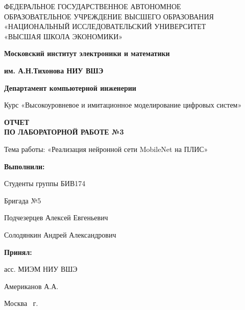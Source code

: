 \begin{titlepage}
    \begin{center}
        ФЕДЕРАЛЬНОЕ ГОСУДАРСТВЕННОЕ АВТОНОМНОЕ \\
        ОБРАЗОВАТЕЛЬНОЕ УЧРЕЖДЕНИЕ ВЫСШЕГО ОБРАЗОВАНИЯ\\
        «НАЦИОНАЛЬНЫЙ ИССЛЕДОВАТЕЛЬСКИЙ УНИВЕРСИТЕТ\\
        «ВЫСШАЯ ШКОЛА ЭКОНОМИКИ»
    \end{center}

    \begin{center}
        \textbf{Московский институт электроники и математики}

        \textbf{им. А.Н.Тихонова НИУ ВШЭ}

        \vspace{2ex}

        \textbf{Департамент компьютерной инженерии}
    \end{center}
    \vspace{1ex}

    \begin{center}
        Курс «Высокоуровневое и имитационное моделирование цифровых систем»
    \end{center}


    \begin{center}
        \textbf{ОТЧЕТ\\
        ПО ЛАБОРАТОРНОЙ РАБОТЕ №3
        }
    \end{center}

    \begin{center}
        Тема работы: «Реализация нейронной сети MobileNet на ПЛИС»
    \end{center}

    \vspace{2ex}

    \begin{flushright}
        \textbf{Выполнили:}

        \vspace{2ex}

        Студенты группы БИВ174

        Бригада №5

        \vspace{2ex}

        Подчезерцев Алексей Евгеньевич

        Солодянкин Андрей Александрович
        \vspace{2ex}

        \textbf{Принял:}

        асс. МИЭМ НИУ ВШЭ

        Американов А.А.

    \end{flushright}

    \vfill
    \begin{center}
        Москва \the\year \, г.
    \end{center}

\end{titlepage}
\addtocounter{page}{1}